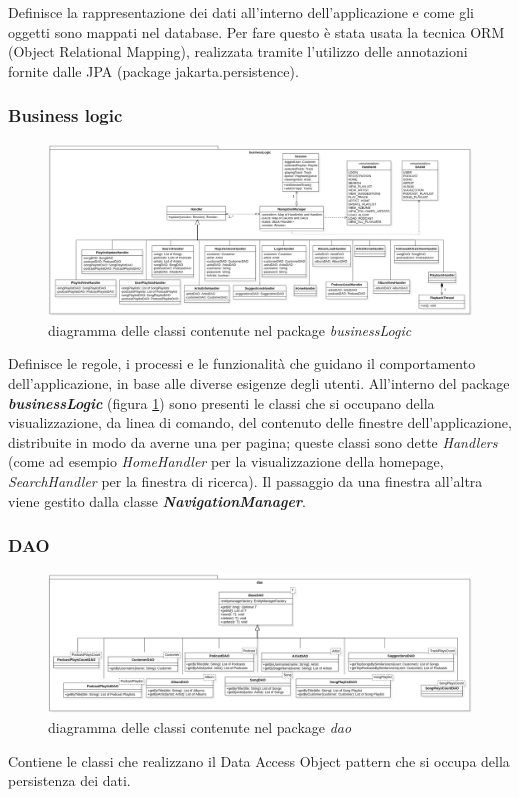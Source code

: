 \documentclass{article}
\begin{document}
  Definisce la rappresentazione dei dati all'interno dell'applicazione e come gli oggetti sono mappati nel database. Per fare questo è stata usata la tecnica ORM (Object Relational Mapping), realizzata tramite l'utilizzo delle annotazioni fornite dalle JPA (package jakarta.persistence).

  \subsubsection{Business logic}

  \begin{figure}[H]
    \centering
    \includegraphics[width=1\linewidth]{businessLogic.png}
    \caption{diagramma delle classi contenute nel package \textit{businessLogic}}
    \label{fig:businessLogic}
  \end{figure}

  Definisce le regole, i processi e le funzionalità che guidano il comportamento dell’applicazione, in base alle diverse esigenze degli utenti. All'interno del package \textbf{\textit{businessLogic}} (figura \ref{fig:businessLogic}) sono presenti le classi che si occupano della visualizzazione, da linea di comando, del contenuto delle finestre dell'applicazione, distribuite in modo da averne una per pagina; queste classi sono dette \textit{Handlers} (come ad esempio \textit{HomeHandler} per la visualizzazione della homepage, \textit{SearchHandler} per la finestra di ricerca). Il passaggio da una finestra all'altra viene gestito dalla classe \textbf{\textit{NavigationManager}}.

  \subsubsection{DAO}
  \begin{figure}[H]
    \centering
    \includegraphics[width=1\linewidth]{DAOs.png}
    \caption{diagramma delle classi contenute nel package \textit{dao}}
    \label{fig:DAO}
  \end{figure}
  Contiene le classi che realizzano il Data Access Object pattern che si occupa della persistenza dei dati.
\end{document}
